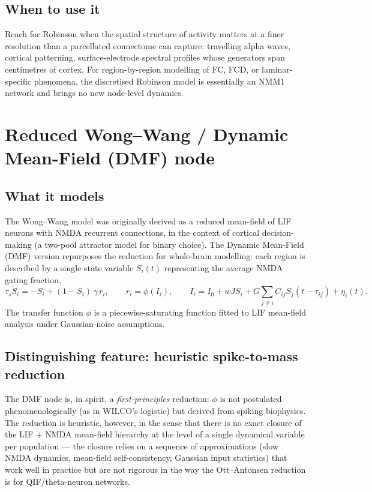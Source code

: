 \documentclass[11pt,a4paper]{article}
\begin{document}
\subsection{When to use it}

Reach for Robinson when the spatial structure of activity matters at a finer resolution than a parcellated connectome can capture: travelling alpha waves, cortical patterning, surface-electrode spectral profiles whose generators span centimetres of cortex. For region-by-region modelling of FC, FCD, or laminar-specific phenomena, the discretised Robinson model is essentially an NMM1 network and brings no new node-level dynamics.

\section{Reduced Wong--Wang / Dynamic Mean-Field (DMF) node}
\label{sec:dmf}

\subsection{What it models}

The Wong--Wang model\cite{WongWang2006} was originally derived as a reduced mean-field of LIF neurons with NMDA recurrent connections, in the context of cortical decision-making (a two-pool attractor model for binary choice). The Dynamic Mean-Field (DMF) version\cite{Deco2013} repurposes the reduction for whole-brain modelling: each region is described by a single state variable $S_i(t)$ representing the average NMDA gating fraction,
\begin{equation}
\label{eq:dmf}
\tau_s \dot S_i = -S_i + (1-S_i)\,\gamma\,r_i, \qquad r_i = \phi(I_i),
\qquad I_i = I_0 + wJ S_i + G\sum_{j\neq i} C_{ij} S_j(t-\tau_{ij}) + \eta_i(t).
\end{equation}
The transfer function $\phi$ is a piecewise-saturating function fitted to LIF mean-field analysis under Gaussian-noise assumptions.

\subsection{Distinguishing feature: heuristic spike-to-mass reduction}

The DMF node is, in spirit, a \emph{first-principles} reduction: $\phi$ is not postulated phenomenologically (as in WILCO's logistic) but derived from spiking biophysics. The reduction is heuristic, however, in the sense that there is no exact closure of the LIF + NMDA mean-field hierarchy at the level of a single dynamical variable per population --- the closure relies on a sequence of approximations (slow NMDA dynamics, mean-field self-consistency, Gaussian input statistics) that work well in practice but are not rigorous in the way the Ott--Antonsen reduction is for QIF/theta-neuron networks.
\end{document}
